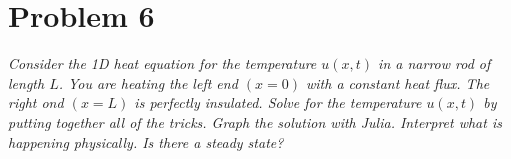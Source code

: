 \documentclass[12pt]{article}
\theoremstyle{remark}
\begin{document}
\pagebreak

\section*{Problem 6}

\textit{Consider the 1D heat equation for the temperature $u(x,t)$ in a narrow rod of length $L$. You are heating the left end $(x = 0)$ with a constant heat flux. The right ond $(x = L)$ is perfectly insulated. Solve for the temperature $u(x,t)$ by putting together all of the tricks. Graph the solution with Julia. Interpret what is happening physically. Is there a steady state?} \\

 \\
\end{document}
